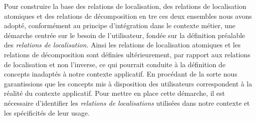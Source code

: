 Pour construire la base des relations de localisation, des relations
de localisation atomiques et des relations de décomposition en tre ces
deux ensembles nous avons adopté, conformément au principe
d'intégration dans le contexte métier, une démarche centrée sur le
besoin de l'utilisateur, \ie fondée sur la définition préalable des
\emph{relations de localisation.} Ainsi les relations de localisation
atomiques et les relations de décomposition sont définies
ultérieurement, par rapport aux relations de localisation et non
l'inverse, ce qui pourrait conduite à la définition de concepts
inadaptés à notre contexte applicatif.  En procédant de la sorte nous
garantissions que les concepts mis à disposition des utilisateurs
correspondent à la réalité du contexte applicatif. Pour mettre en
place cette démarche, il est nécessaire d'identifier les
\emph{relations de localisations} utilisées dans notre contexte et les
spécificités de leur usage.

